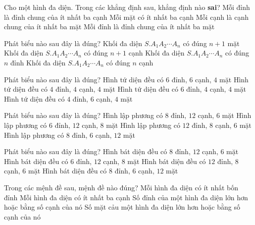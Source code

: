 \begin{ex}%
\end{ex}
\begin{ex}%
	Cho một hình đa diện. Trong các khẳng định sau, khẳng định nào \textbf{sai}?
	\choice
	{Mỗi đỉnh là đỉnh chung của ít nhất ba cạnh}
	{Mỗi mặt có ít nhất ba cạnh}
	{\True Mỗi cạnh là cạnh chung của ít nhất ba mặt}
	{Mỗi đỉnh là đỉnh chung của ít nhất ba mặt}
\end{ex}
\begin{ex}%
	Phát biểu nào sau đây là đúng?
	\choice
	{\True Khối đa diện $S.A_1A_2\cdots A_n$ có đúng $n+1$ mặt}
	{Khối đa diện $S.A_1A_2\cdots A_n$ có đúng $n+1$ cạnh}
	{Khối đa diện $S.A_1A_2\cdots A_n$ có đúng $n$ đỉnh}
	{Khối đa diện $S.A_1A_2\cdots A_n$ có đúng $n$ cạnh}
\end{ex}
\begin{ex}%
	Phát biểu nào sau đây là đúng?
	\choice
	{Hình tứ diện đều có $6$ đỉnh, $6$ cạnh, $4$ mặt}
	{Hình tứ diện đều có $4$ đỉnh, $4$ cạnh, $4$ mặt}
	{Hình tứ diện đều có $6$ đỉnh, $4$ cạnh, $4$ mặt}
	{\True Hình tứ diện đều có $4$ đỉnh, $6$ cạnh, $4$ mặt}
\end{ex}
\begin{ex}%
	Phát biểu nào sau đây là đúng?
	\choice
	{\True Hình lập phương có $8$ đỉnh, $12$ cạnh, $6$ mặt}
	{Hình lập phương có $6$ đỉnh, $12$ cạnh, $8$ mặt}
	{Hình lập phương có $12$ đỉnh, $8$ cạnh, $6$ mặt}
	{Hình lập phương có $8$ đỉnh, $6$ cạnh, $12$ mặt}
\end{ex}
\begin{ex}%
	Phát biểu nào sau đây là đúng?
	\choice
	{Hình bát diện đều có $8$ đỉnh, $12$ cạnh, $6$ mặt}
	{\True Hình bát diện đều có $6$ đỉnh, $12$ cạnh, $8$ mặt}
	{Hình bát diện đều có $12$ đỉnh, $8$ cạnh, $6$ mặt}
	{Hình bát diện đều có $8$ đỉnh, $6$ cạnh, $12$ mặt}
\end{ex}
\begin{ex}%
	Trong các mệnh đề sau, mệnh đề nào đúng?
	\choice
	{\True Mỗi hình đa diện có ít nhất bốn đỉnh}
	{Mỗi hình đa diện có ít nhất ba cạnh}
	{Số đỉnh của một hình đa diện lớn hơn hoặc bằng số cạnh của nó}
	{Số mặt cảu một hình đa diện lớn hơn hoặc bằng số cạnh của nó}
\end{ex}

